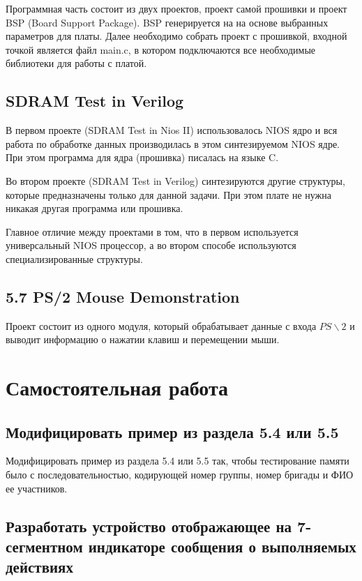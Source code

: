 \documentclass[a4paper,14pt]{article}
\begin{document}
	Программная часть состоит из двух проектов, проект самой прошивки и проект BSP (Board Support Package).
	BSP генерируется на на основе выбранных параметров для платы.
	Далее необходимо собрать проект с прошивкой, входной точкой является файл main.c, в котором подключаются все необходимые библиотеки для работы с платой.
	
	\subsection{SDRAM Test in Verilog} 
	
	В первом проекте (SDRAM Test in Nios II) использовалось NIOS ядро и вся работа по обработке данных производилась в этом синтезируемом NIOS ядре. При этом программа для ядра (прошивка) писалась на языке C.
	
	Во втором проекте (SDRAM Test in Verilog) синтезируются другие структуры, которые предназначены только для данной задачи. При этом плате не нужна никакая другая программа или прошивка. 
	
	Главное отличие между проектами в том, что в первом используется универсальный NIOS процессор, а во втором способе используются специализированные структуры.
	
	\subsection{5.7 PS/2 Mouse Demonstration} 
	
	Проект состоит из одного модуля, который обрабатывает данные с входа $PS \backslash 2$ и выводит информацию о нажатии клавиш и перемещении мыши.
	

	\section{Самостоятельная работа}
	
	\subsection{Модифицировать пример из раздела 5.4 или 5.5}
	
	Модифицировать пример из раздела 5.4 или 5.5 так, чтобы тестирование памяти было с последовательностью, кодирующей номер группы, номер бригады и ФИО ее участников.
	
	\subsection{Разработать устройство отображающее на 7-сегментном индикаторе сообщения о выполняемых действиях}
	
\end{document}
